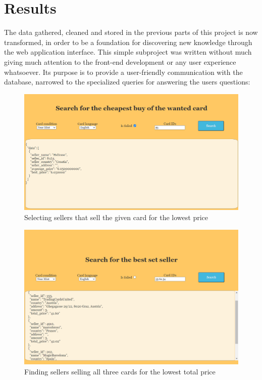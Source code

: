 \chapter{Results}
\label{ch:results}
The data gathered, cleaned and stored in the previous parts of this project is now transformed, in order to be a foundation for discovering new knowledge through the web application interface. This simple subproject was written without much giving much attention to the front-end development or any user experience whatsoever. Its purpose is to provide a user-friendly communication with the database, narrowed to the specialized queries for answering the users questions:

\begin{figure}
    \centering
    \includegraphics[width=\textwidth]{figures/cheapest_buy.png}
    \caption{Selecting sellers that sell the given card for the lowest price}
    \label{fig:cheapest_buy}
\end{figure}

\begin{figure}
    \centering
    \includegraphics[width=\textwidth]{figures/best_set_seller.png}
    \caption{Finding sellers selling all three cards for the lowest total price}
    \label{fig:best_set_seller}
\end{figure}

